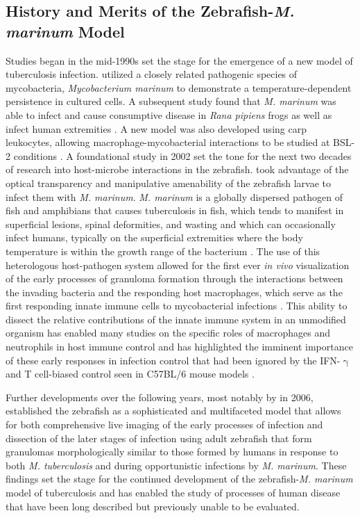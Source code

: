 \subsection{History and Merits of the Zebrafish\hyp{}\textit{M. marinum} Model}\label{zfmmhis}

Studies began in the mid\hyp{}1990s set the stage for the emergence of a new model of tuberculosis infection. \citeauthor{Ramakrishnan1994} utilized a closely related pathogenic species of mycobacteria, \textit{Mycobacterium marinum} to demonstrate a temperature\hyp{}dependent persistence in cultured cells. A subsequent study found that \textit{M. marinum} was able to infect and cause consumptive disease in \textit{Rana pipiens} frogs as well as infect human extremities \citep{Ramakrishnan1997a, Ramakrishnan1997b, Cosma2006}. A new model was also developed using carp leukocytes, allowing macrophage\hyp{}mycobacterial interactions to be studied at BSL\hyp{}2 conditions \citep{ElEtr2001}. A foundational study in 2002 set the tone for the next two decades of research into host\hyp{}microbe interactions in the zebrafish. \citeauthor{Davis2002} took advantage of the optical transparency and manipulative amenability of the zebrafish larvae to infect them with \textit{M. marinum}. \textit{M. marinum} is a globally dispersed pathogen of fish and amphibians that causes tuberculosis in fish, which tends to manifest in superficial lesions, spinal deformities, and wasting and which can occasionally infect humans, typically on the superficial extremities where the body temperature is within the growth range of the bacterium \citep{Aronson1926, Parisot1958, Gray1990, Hashish2018}. The use of this heterologous host\hyp{}pathogen system allowed for the first ever \textit{in vivo} visualization of the early processes of granuloma formation through the interactions between the invading bacteria and the responding host macrophages, which serve as the first responding innate immune cells to mycobacterial infections \citep{Davis2002, Davis2009}. This ability to dissect the relative contributions of the innate immune system in an unmodified organism has enabled many studies on the specific roles of macrophages and neutrophils in host immune control and has highlighted the imminent importance of these early responses in infection control that had been ignored by the IFN\hyp{}$\upgamma$ and T cell\hyp{}biased control seen in C57BL/6 mouse models \citep{Lesley2008}.

Further developments over the following years, most notably by \citeauthor{Swaim2006} in 2006, established the zebrafish as a sophisticated and multifaceted model that allows for both comprehensive live imaging of the early processes of infection and dissection of the later stages of infection using adult zebrafish that form granulomas morphologically similar to those formed by humans in response to both \textit{M. tuberculosis} and during opportunistic infections by \textit{M. marinum}. These findings set the stage for the continued development of the zebrafish\hyp{}\textit{M. marinum} model of tuberculosis and has enabled the study of processes of human disease that have been long described but previously unable to be evaluated.

